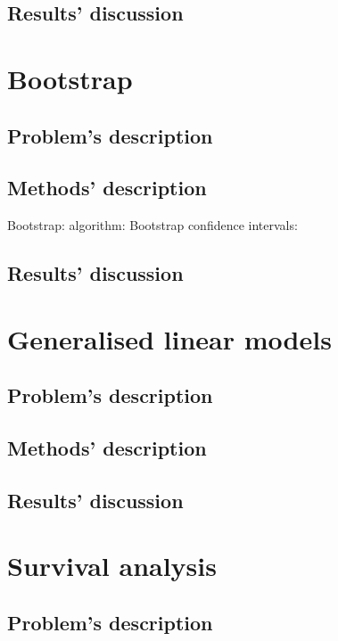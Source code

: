 \documentclass{report}
\begin{document}
\section{Results' discussion}


\chapter{Bootstrap}
\section{Problem's description}

\section{Methods' description}
Bootstrap:
algorithm:
Bootstrap confidence intervals:


\section{Results' discussion}


\chapter{Generalised linear models}
\section{Problem's description}

\section{Methods' description}

\section{Results' discussion}


\chapter{Survival analysis}
\section{Problem's description}
\end{document}
